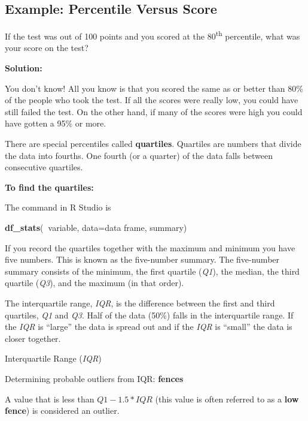 \documentclass[
]{book}
\newenvironment{Shaded}{\begin{snugshade}}{\end{snugshade}}
\newcommand{\DataTypeTok}[1]{\textcolor[rgb]{0.13,0.29,0.53}{#1}}
\newcommand{\KeywordTok}[1]{\textcolor[rgb]{0.13,0.29,0.53}{\textbf{#1}}}
\newcommand{\NormalTok}[1]{#1}
\newcommand{\OperatorTok}[1]{\textcolor[rgb]{0.81,0.36,0.00}{\textbf{#1}}}
\begin{document}
\hypertarget{example-percentile-versus-score}{%
\subsection{Example: Percentile Versus Score}\label{example-percentile-versus-score}}

If the test was out of 100 points and you scored at the 80\textsuperscript{th} percentile, what was your score on the test?

\textbf{Solution:}

You don't know! All you know is that you scored the same as or better than 80\% of the people who took the test. If all the scores were really low, you could have still failed the test. On the other hand, if many of the scores were high you could have gotten a 95\% or more.

There are special percentiles called \textbf{quartiles}. Quartiles are numbers that divide the data into fourths. One fourth (or a quarter) of the data falls between consecutive quartiles.

\textbf{To find the quartiles:}

The command in R Studio is

\begin{Shaded}
\begin{Highlighting}[]
\KeywordTok{df_stats}\NormalTok{(}\OperatorTok{~}\NormalTok{variable, }\DataTypeTok{data=}\NormalTok{data frame, summary)}
\end{Highlighting}
\end{Shaded}

If you record the quartiles together with the maximum and minimum you have five numbers. This is known as the five-number summary. The five-number summary consists of the minimum, the first quartile (\emph{Q1}),
the median, the third quartile (\emph{Q3}), and the maximum (in that order).

The interquartile range, \emph{IQR}, is the difference between the first and third quartiles, \emph{Q1} and \emph{Q3}. Half of the data (50\%) falls in the interquartile range. If the \emph{IQR} is ``large'' the data is spread out and if the \emph{IQR} is ``small'' the data is closer together.

Interquartile Range (\emph{IQR})

Determining probable outliers from IQR: \textbf{fences}

A value that is less than \(Q1-1.5*IQR\) (this value is often referred to as a \textbf{low} \textbf{fence}) is considered an outlier.
\end{document}
